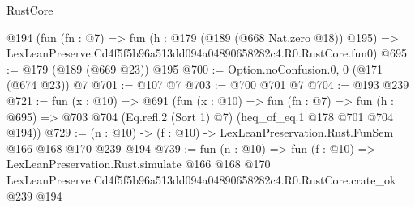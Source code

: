 \begin{lexlean}{RustCore}
\begin{coremodule}
    @194
    (fun (fn : @7) =>
    fun (h : @179 (@189 (@668 Nat.zero @18)) @195) =>
    LexLeanPreserve.Cd4f5f5b96a513dd094a04890658282c4.R0.RustCore.fun0)
@695 := @179 (@189 (@669 @23)) @195
@700 := Option.noConfusion.{0, 0} (@171 (@674 @23)) @7
@701 := @107 @7
@703 := @700 @701 @7
@704 := @193 @239
@721 := fun (x : @10) =>
  @691
    (fun (x : @10) =>
    fun (fn : @7) =>
    fun (h : @695) => @703 @704 (Eq.refl.{2} (Sort 1) @7) (heq_of_eq.{1} @178 @701 @704 @194))
@729 := (n : @10) -> (f : @10) -> LexLeanPreservation.Rust.FunSem @166 @168 @170 @239 @194
@739 := fun (n : @10) =>
  fun (f : @10) =>
  LexLeanPreservation.Rust.simulate
    @166
    @168
    @170
    LexLeanPreserve.Cd4f5f5b96a513dd094a04890658282c4.R0.RustCore.crate_ok
    @239
    @194
\end{coremodule}
\end{lexlean}
